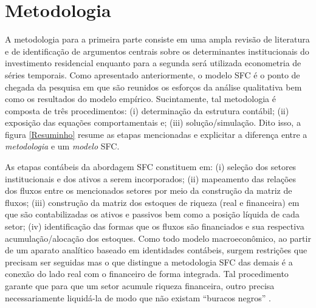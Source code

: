 \section{Metodologia}\label{passos}


A metodologia para a primeira parte consiste em uma ampla revisão de literatura e de identificação de argumentos centrais sobre os determinantes institucionais do investimento residencial enquanto para a segunda será utilizada econometria de séries temporais. 
Como apresentado anteriormente, o modelo SFC é o ponto de chegada da pesquisa em que são reunidos os esforços da análise qualitativa bem como os resultados do modelo empírico. Sucintamente, tal metodologia é composta de três procedimentos: (i) determinação da estrutura contábil; (ii) exposição das equações comportamentais e; (iii) solução/simulação. Dito isso, a figura \ref{Resuminho} resume as etapas mencionadas e explicitar a diferença entre a \textit{metodologia} e um \textit{modelo} SFC. 




As etapas contábeis da abordagem SFC constituem em: (i) seleção dos setores institucionais e dos ativos a serem incorporados; (ii) mapeamento das relações dos fluxos entre os mencionados setores por meio da construção da matriz de fluxos; (iii) construção da matriz dos estoques de riqueza (real e financeira) em que são contabilizadas os ativos e passivos  bem como a posição líquida de cada setor; (iv) identificação das formas que os fluxos são financiados e sua respectiva acumulação/alocação dos estoques. 
Como todo modelo macroeconômico, ao partir de um aparato analítico
baseado em identidades contábeis, surgem restrições que precisam ser seguidas mas o que distingue
a metodologia SFC das demais é a conexão do lado real com o financeiro de forma integrada.
Tal procedimento garante que para que um setor acumule riqueza financeira, outro precisa necessariamente liquidá-la de modo que não existam ``buracos negros'' \cite{godley_money_1996}.

